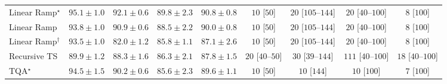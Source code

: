 \begin{tabular}{l|cccc|cccc|}
Linear Ramp$^\star$ & {\cellcolor[HTML]{00532F}} \color[HTML]{F1F1F1} $95.1\pm 1.0$ & {\cellcolor[HTML]{006636}} \color[HTML]{F1F1F1} $92.1\pm 0.6$ & {\cellcolor[HTML]{0C723B}} \color[HTML]{F1F1F1} $89.8\pm 2.3$ & {\cellcolor[HTML]{066D39}} \color[HTML]{F1F1F1} $90.8\pm 0.8$ & {\cellcolor[HTML]{FFF6F2}} \color[HTML]{000000} $10$ [$50$] & {\cellcolor[HTML]{FFF3EF}} \color[HTML]{000000} $20$ [$105$--$144$] & {\cellcolor[HTML]{FFF3EF}} \color[HTML]{000000} $20$ [$40$--$100$] & {\cellcolor[HTML]{FFF6F2}} \color[HTML]{000000} $8$ [$100$] \\
Linear Ramp & {\cellcolor[HTML]{005B32}} \color[HTML]{F1F1F1} $93.8\pm 1.0$ & {\cellcolor[HTML]{056C39}} \color[HTML]{F1F1F1} $90.9\pm 0.6$ & {\cellcolor[HTML]{14783E}} \color[HTML]{F1F1F1} $88.5\pm 2.2$ & {\cellcolor[HTML]{0B713B}} \color[HTML]{F1F1F1} $90.0\pm 0.8$ & {\cellcolor[HTML]{FFF6F2}} \color[HTML]{000000} $10$ [$50$] & {\cellcolor[HTML]{FFF3EF}} \color[HTML]{000000} $20$ [$105$--$144$] & {\cellcolor[HTML]{FFF3EF}} \color[HTML]{000000} $20$ [$40$--$100$] & {\cellcolor[HTML]{FFF6F2}} \color[HTML]{000000} $8$ [$100$] \\
Linear Ramp$^\dagger$ & {\cellcolor[HTML]{005D33}} \color[HTML]{F1F1F1} $93.5\pm 1.0$ & {\cellcolor[HTML]{39A056}} \color[HTML]{F1F1F1} $82.0\pm 1.2$ & {\cellcolor[HTML]{248644}} \color[HTML]{F1F1F1} $85.8\pm 1.1$ & {\cellcolor[HTML]{1D7F41}} \color[HTML]{F1F1F1} $87.1\pm 2.6$ & {\cellcolor[HTML]{FFF6F2}} \color[HTML]{000000} $10$ [$50$] & {\cellcolor[HTML]{FFF3EF}} \color[HTML]{000000} $20$ [$105$--$144$] & {\cellcolor[HTML]{FFF3EF}} \color[HTML]{000000} $20$ [$40$--$100$] & {\cellcolor[HTML]{FFF6F2}} \color[HTML]{000000} $8$ [$100$] \\
Recursive TS & {\cellcolor[HTML]{0B713B}} \color[HTML]{F1F1F1} $89.9\pm 1.2$ & {\cellcolor[HTML]{15793E}} \color[HTML]{F1F1F1} $88.3\pm 1.6$ & {\cellcolor[HTML]{228343}} \color[HTML]{F1F1F1} $86.3\pm 2.1$ & {\cellcolor[HTML]{187B3F}} \color[HTML]{F1F1F1} $87.8\pm 1.5$ & {\cellcolor[HTML]{FFF3EF}} \color[HTML]{000000} $20$ [$40$--$50$] & {\cellcolor[HTML]{FEF1ED}} \color[HTML]{000000} $30$ [$39$--$144$] & {\cellcolor[HTML]{FDDDD9}} \color[HTML]{000000} $111$ [$40$--$100$] & {\cellcolor[HTML]{FFF3F0}} \color[HTML]{000000} $18$ [$40$--$100$] \\
TQA$^\star$ & {\cellcolor[HTML]{005730}} \color[HTML]{F1F1F1} $94.5\pm 1.5$ & {\cellcolor[HTML]{096F3A}} \color[HTML]{F1F1F1} $90.2\pm 0.6$ & {\cellcolor[HTML]{258745}} \color[HTML]{F1F1F1} $85.6\pm 2.3$ & {\cellcolor[HTML]{0D733C}} \color[HTML]{F1F1F1} $89.6\pm 1.1$ & {\cellcolor[HTML]{FFF6F2}} \color[HTML]{000000} $10$ [$50$] & {\cellcolor[HTML]{FFF6F2}} \color[HTML]{000000} $10$ [$144$] & {\cellcolor[HTML]{FFF6F2}} \color[HTML]{000000} $10$ [$100$] & {\cellcolor[HTML]{FFF6F2}} \color[HTML]{000000} $7$ [$100$] \\

\end{tabular}
